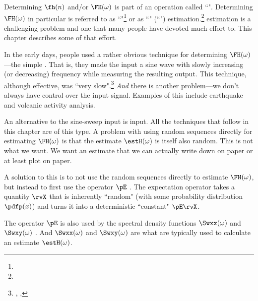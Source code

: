 Determining $\fh(n)$ and/or $\FH(\omega)$ is part of an operation called ``".
Determining $\FH(\omega)$ in particular is referred to as
``"\footnote{}
or as
``" (``") estimation.\footnote{}
 estimation is a challenging problem and one that
many people have devoted much effort to.
This chapter describes some of that effort.

In the early days, people used a rather obvious technique for determining $\FH(\omega)$---the simple
. That is, they made the input a sine wave with slowly increasing (or decreasing)
frequency while measuring the resulting output.
This technique, although effective, was ``very slow".\footnote{
  ,
  ,
  }
\emph{And} there is another problem---we don't always have control over the input signal.
Examples of this include earthquake and volcanic activity analysis.

An alternative to the sine-sweep input is  input.
All the techniques that follow in this chapter are of this type.
A problem with using random sequences directly for estimating $\FH(\omega)$ is that the
estimate $\estH(\omega)$ is itself also random.
This is not what we want. We want an estimate that we can actually write down
on paper or at least plot on paper.

A solution to this is to not use the random sequences directly to estimate $\FH(\omega)$,
but instead to first use the  operator $\pE$ .
The expectation operator takes a quantity $\rvX$ that is inherently ``random"
(with some probability distribution $\pdfp(x)$) and
turns it into a deterministic ``constant" $\pE\rvX$.

The operator $\pE$ is also used by the spectral density functions
$\Swxx(\omega)$ and $\Swxy(\omega)$ .
And $\Swxx(\omega)$ and $\Swxy(\omega)$ are what are typically used to calculate
an estimate $\estH(\omega)$.

